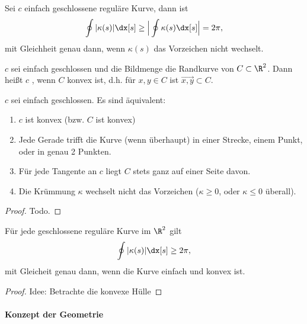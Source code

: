 \begin{kor}
	Sei $c$ einfach geschlossene reguläre Kurve, dann ist
	\[
		\oint |\kappa(s)| \dx[s]
		\ge \Big| \oint \kappa(s) \dx[s] \Big|
		= 2\pi,
	\]
	mit Gleichheit genau dann, wenn $\kappa(s)$ das Vorzeichen nicht wechselt.
\end{kor}

\begin{df}
	$c$ sei einfach geschlossen und die Bildmenge die Randkurve von $C \subset \R^2$.
	Dann heißt $c$ , wenn $C$ konvex ist, d.h. für $x,y \in C$ ist $\vec{x,y} \subset C$.
\end{df}

\begin{st}
	$c$ sei einfach geschlossen.
	Es sind äquivalent:
	\begin{enumerate}[1)]
		\item
			$c$ ist konvex (bzw. $C$ ist konvex)
		\item
			Jede Gerade trifft die Kurve (wenn überhaupt) in einer Strecke, einem Punkt, oder in genau 2 Punkten.
		\item
			Für jede Tangente an $c$ liegt $C$ stets ganz auf einer Seite davon.
		\item
			Die Krümmung $\kappa$ wechselt nicht das Vorzeichen ($\kappa \ge 0$, oder $\kappa \le 0$ überall).
	\end{enumerate}
	\begin{proof}
		Todo.
	\end{proof}
\end{st}

\begin{kor}
	Für jede geschlossene reguläre Kurve im $\R^2$ gilt
	\[
		\oint |\kappa(s)| \dx[s]
		\ge 2\pi,
	\]
	mit Gleicheit genau dann, wenn die Kurve einfach und konvex ist.
	\begin{proof}
		Idee: Betrachte die konvexe Hülle
	\end{proof}
\end{kor}


\paragraph{Konzept der Geometrie}

